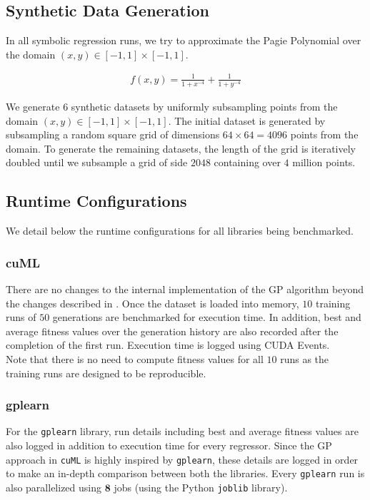\subsection{Synthetic Data Generation}
\label{subsec:datagen}
In all symbolic regression runs, we try to approximate the Pagie Polynomial\citep{Pagie1997} over the domain $(x,y) \in [-1,1] \times [-1,1]$.

\begin{align}
  f(x,y) = \frac{1}{1 + x^{-4}} + \frac{1}{1 + y^{-4}}
\end{align}

We generate $6$ synthetic datasets by uniformly subsampling points from the domain $(x,y) \in [-1,1] \times [-1,1]$. The initial dataset is generated by subsampling a random square grid of dimensions $64 \times 64 = 4096$ points from the domain. To generate the remaining datasets, the length of the grid is iteratively doubled until we subsample a grid of side $2048$ containing over $4$ million points.

\subsection{Runtime Configurations}
\label{subsec:rtconfig}
We detail below the runtime configurations for all libraries being benchmarked. 
\subsubsection{cuML} 
There are no changes to the internal implementation of the GP algorithm beyond the changes described in . Once the dataset is loaded into memory, $10$ training runs of $50$ generations are benchmarked for execution time. In addition, best and average fitness values over the generation history are also recorded after the completion of the first run. Execution time is logged using CUDA Events.\\
Note that there is no need to compute fitness values for all $10$ runs as the training runs are designed to be reproducible. 

\subsubsection{gplearn}
For the \texttt{gplearn} library, run details including best and average fitness values are also logged in addition to execution time for every regressor. Since the GP approach in \texttt{cuML} is highly inspired by \texttt{gplearn}, these details are logged in order to make an in-depth comparison between both the libraries.
Every \texttt{gplearn} run is also parallelized using $\mathbf{8}$ jobs (using the Python \lstinline!joblib! library).

